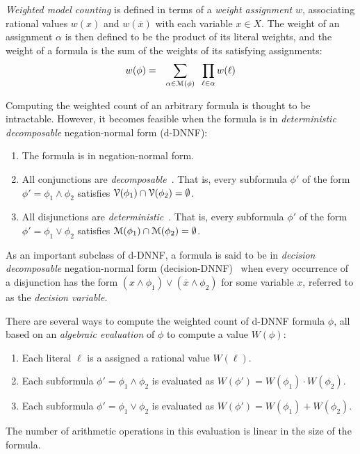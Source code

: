 \documentclass[letterpaper,USenglish,cleveref, autoref, thm-restate]{lipics-v2021}
\newcommand{\obar}[1]{\overline{#1}}
\newcommand{\lit}{\ell}
\newcommand{\varset}{X}
\newcommand{\dependencyset}{{\cal V}}
\newcommand{\assign}{\alpha}
\newcommand{\modelset}{{\cal M}}
\begin{document}
\emph{Weighted model counting} is defined in terms of a \emph{weight
  assignment} $w$, associating rational values $w(x)$ and
$w(\obar{x})$ with each variable $x \in \varset$.
The weight of an
assignment $\assign$ is then defined to be the product of its literal weights, and the weight
of a formula is the sum of the weights of its satisfying assignments:
\begin{eqnarray}
  w(\phi) & = & \sum_{\assign \in \modelset(\phi)} \;\;\prod_{\lit \in \assign} w(\lit) \label{eqn:wmc}
\end{eqnarray}

Computing the weighted count of an arbitrary formula is thought to be intractable.  However, it becomes
feasible when the formula is in \emph{deterministic decomposable} negation-normal form (d-DNNF):
\begin{enumerate}
\item The formula is in negation-normal form.  
\item All conjunctions are \emph{decomposable}~\cite{darwiche:jacm:2001,darwiche:jair:2002}.  That is, every subformula $\phi'$ of the form $\phi' = \phi_1 \land \phi_2$
  satisfies $\dependencyset(\phi_1) \cap \dependencyset(\phi_2) = \emptyset$.
\item All disjunctions are \emph{deterministic}~\cite{darwiche:jancl:2001,darwiche:jair:2002}.  That is, every subformula $\phi'$ of the form $\phi' =\phi_1 \lor \phi_2$ satisfies
  $\modelset(\phi_1) \cap \modelset(\phi_2) = \emptyset$.
\end{enumerate}
As an important subclass of d-DNNF, a formula is said to be in 
\emph{decision decomposable} negation-normal form (decision-DNNF)~\cite{huang:jair:2007} when every occurrence of a disjunction has the form 
$(x \land \phi_1) \lor (\obar{x} \land \phi_2)$ for some variable $x$, referred to as the \emph{decision variable}.

There are several ways to compute the weighted count of d-DNNF formula $\phi$, all
based on an \emph{algebraic evaluation} of $\phi$ to compute a value $W(\phi)$:
\begin{enumerate}
\item Each literal $\lit$ is a assigned a rational value $W(\lit)$.
\item Each subformula $\phi' = \phi_1 \land \phi_2$ is evaluated as $W(\phi') = W(\phi_1) \cdot W(\phi_2)$.
\item Each subformula $\phi' = \phi_1 \lor \phi_2$ is evaluated as $W(\phi') = W(\phi_1) + W(\phi_2)$.
\end{enumerate}
The number of arithmetic operations in this evaluation is linear in the size of the formula.
\end{document}
